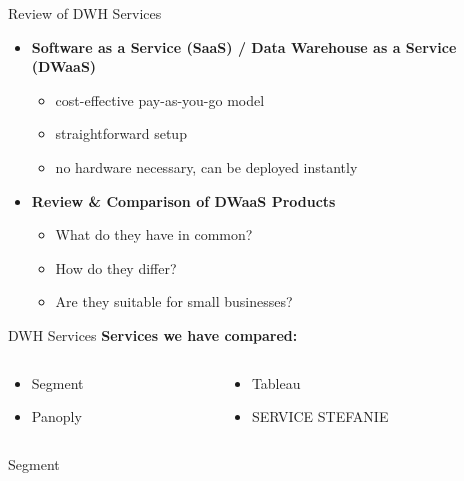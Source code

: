 \documentclass[aspectratio=169]{beamer}
\begin{document}
  \begin{frame}{Review of DWH Services}
    \begin{itemize}
      \item \textbf{Software as a Service (SaaS) / Data Warehouse as a Service (DWaaS)}
      	\begin{itemize}
      	   \item cost-effective pay-as-you-go model
           \item straightforward setup
           \item no hardware necessary, can be deployed instantly
      	\end{itemize}
      \item \textbf{Review \& Comparison of DWaaS Products}
        \begin{itemize}
           \item What do they have in common?
      	   \item How do they differ?
      	   \item Are they suitable for small businesses?
      	\end{itemize}
    \end{itemize}
  \end{frame}

  \begin{frame}{DWH Services}
    \textbf{Services we have compared:}

    \begin{columns}
      \begin{column}{0.5\textwidth}
        \begin{itemize}
          \item Segment
          \item Panoply
        \end{itemize}
      \end{column}

      \begin{column}{0.5\textwidth}
        \begin{itemize}
          \item Tableau
          \item SERVICE STEFANIE
        \end{itemize}
      \end{column}
    \end{columns}
  \end{frame}
  
  \begin{frame}{Segment}

  \end{frame}
  
\end{document}

